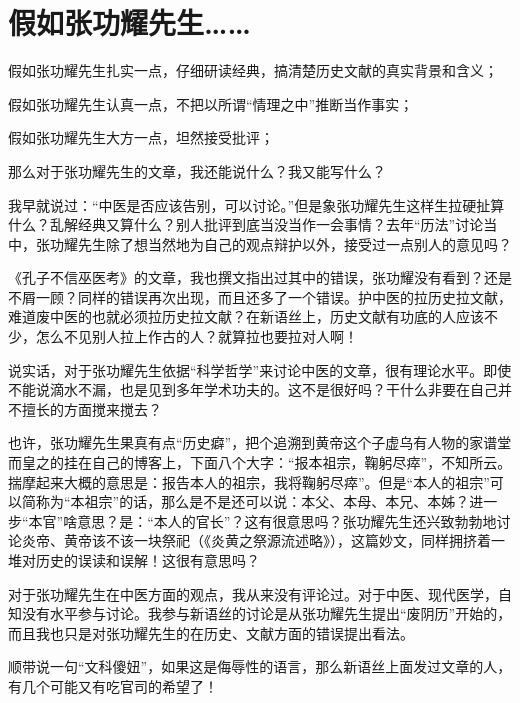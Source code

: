 \section{假如张功耀先生……}
假如张功耀先生扎实一点，仔细研读经典，搞清楚历史文献的真实背景和含义；

假如张功耀先生认真一点，不把以所谓“情理之中”推断当作事实；

假如张功耀先生大方一点，坦然接受批评；

那么对于张功耀先生的文章，我还能说什么？我又能写什么？

\mbox{}

我早就说过：“中医是否应该告别，可以讨论。”但是象张功耀先生这样生拉硬扯算什么？乱解经典又算什么？别人批评到底当没当作一会事情？去年“历法”讨论当中，张功耀先生除了想当然地为自己的观点辩护以外，接受过一点别人的意见吗？

《孔子不信巫医考》的文章，我也撰文指出过其中的错误，张功耀没有看到？还是不屑一顾？同样的错误再次出现，而且还多了一个错误。护中医的拉历史拉文献，难道废中医的也就必须拉历史拉文献？在新语丝上，历史文献有功底的人应该不少，怎么不见别人拉上作古的人？就算拉也要拉对人啊！

说实话，对于张功耀先生依据“科学哲学”来讨论中医的文章，很有理论水平。即使不能说滴水不漏，也是见到多年学术功夫的。这不是很好吗？干什么非要在自己并不擅长的方面搅来搅去？

也许，张功耀先生果真有点“历史癖”，把个追溯到黄帝这个子虚乌有人物的家谱堂而皇之的挂在自己的博客上，下面八个大字：“报本祖宗，鞠躬尽瘁”，不知所云。揣摩起来大概的意思是：报告本人的祖宗，我将鞠躬尽瘁”。但是“本人的祖宗”可以简称为“本祖宗”的话，那么是不是还可以说：本父、本母、本兄、本姊？进一步“本官”啥意思？是：“本人的官长”？这有很意思吗？张功耀先生还兴致勃勃地讨论炎帝、黄帝该不该一块祭祀（《炎黄之祭源流述略》），这篇妙文，同样拥挤着一堆对历史的误读和误解！这很有意思吗？

对于张功耀先生在中医方面的观点，我从来没有评论过。对于中医、现代医学，自知没有水平参与讨论。我参与新语丝的讨论是从张功耀先生提出“废阴历”开始的，而且我也只是对张功耀先生的在历史、文献方面的错误提出看法。

顺带说一句“文科傻妞”，如果这是侮辱性的语言，那么新语丝上面发过文章的人，有几个可能又有吃官司的希望了！